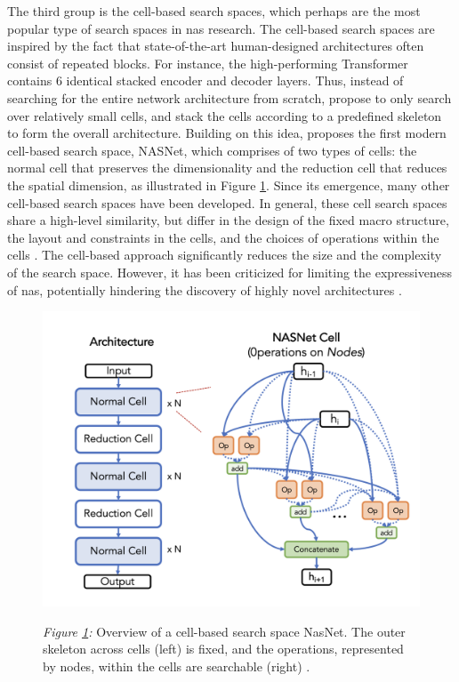 \documentclass[a4paper,oneside,bibliography=totoc]{scrbook}
\begin{document}
\begin{description}[leftmargin=0cm, listparindent=\parindent]
		The third group is the cell-based search spaces, which perhaps are the most popular type of search spaces in \gls{nas} research. The cell-based search spaces are inspired by the fact that state-of-the-art human-designed architectures often consist of repeated blocks. For instance, the high-performing Transformer \cite{vaswani2017attention} contains 6 identical stacked encoder and decoder layers. Thus, instead of searching for the entire network architecture from scratch, \cite{zoph2018learning} propose to only search over relatively small cells, and stack the cells according to a predefined skeleton to form the overall architecture. Building on this idea, \cite{zoph2018learning} proposes the first modern cell-based search space, NASNet, which comprises of two types of cells: the normal cell that preserves the dimensionality and the reduction cell that reduces the spatial dimension, as illustrated in Figure \ref{fig: cellss}. Since its emergence, many other cell-based search spaces have been developed. In general, these cell search spaces share a high-level similarity, but differ in the design of the fixed macro structure, the layout and constraints in the cells, and the choices of operations within the cells \cite{dong2020nasbench201, liu2018darts,  pmlr-v97-ying19a}. The cell-based approach significantly reduces the size and the complexity of the search space. However, it has been criticized for limiting the expressiveness of \gls{nas}, potentially hindering the discovery of highly novel architectures \cite{white2023survey}.	
		
		\begin{figure}[htbp]
			\centering
			\includegraphics[scale=0.4]{figs/overview_cell_based_ss.png}
			\label{fig: cellss}
			\parbox{\linewidth}{
	 		\vspace{0.5em}
 	 		{\small \textit{Figure \ref{fig: cellss}:} Overview of a cell-based search space NasNet. The outer skeleton across cells (left) is fixed, and the operations, represented by nodes, within the cells are searchable (right) \cite{white2023survey}.
			}
 		}
		\end{figure}
		

\end{description}
\end{document}
